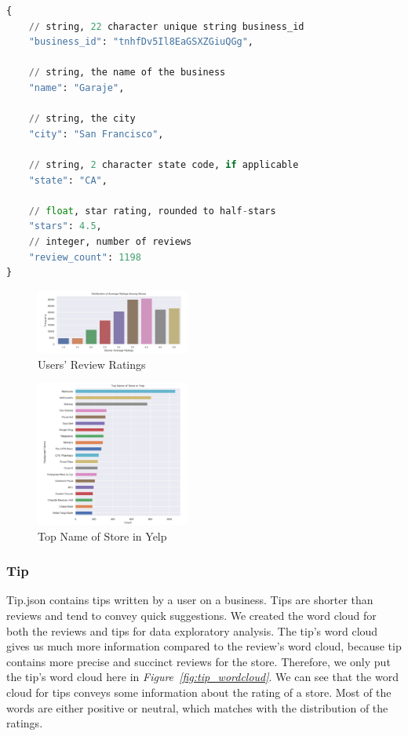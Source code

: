 \documentclass[journal]{IEEEtran}
\begin{document}
\begin{lstlisting}[language=Python, caption=Business Data Example]
{
    // string, 22 character unique string business_id
    "business_id": "tnhfDv5Il8EaGSXZGiuQGg",

    // string, the name of the business
    "name": "Garaje",

    // string, the city
    "city": "San Francisco",

    // string, 2 character state code, if applicable
    "state": "CA",

    // float, star rating, rounded to half-stars
    "stars": 4.5,
    // integer, number of reviews
    "review_count": 1198
}
\end{lstlisting}

\begin{figure}
\begin {center}
\includegraphics[width=0.45\textwidth]{images/stores_average_ratings.png}
\caption{Users' Review Ratings}
\label{fig:review_rating}
\end {center}
\end{figure}

\begin{figure}
\begin {center}
\includegraphics[width=0.45\textwidth]{images/top_name_in_yelp.png}
\caption{Top Name of Store in Yelp}
\label{fig:top_name_store}
\end {center}
\end{figure}

\subsubsection{Tip}
Tip.json contains tips written by a user on a business. Tips are shorter than reviews and tend to convey quick suggestions. We created the word cloud for both the reviews and tips for data exploratory analysis. The tip's word cloud gives us much more information compared to the review's word cloud, because tip contains more precise and succinct reviews for the store. Therefore, we only put the tip's word cloud here in {\it Figure~\ref{fig:tip_wordcloud}}. We can see that the word cloud for tips conveys some information about the rating of a store. Most of the words are either positive or neutral, which matches with the distribution of the ratings. 
\end{document}
